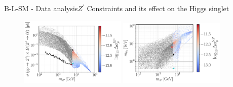 \documentclass[10pt,xcolor=dvipsnames,mathserif]{beamer}
\begin{document}
\begin{frame}{B-L-SM - Data analysis}{$Z^\prime$ Constraints and its effect on the Higgs singlet}
\begin{figure}[!htb]
	\centering
	\includegraphics[width=0.45\textwidth]{Images/BLSM_2/mZp_Xsec_Amu.pdf}
	\includegraphics[width=0.45\textwidth]{Images/BLSM_2/mZp_Mhp_Amu.pdf}
	\label{fig:Plots1}
\end{figure}	
%


\end{frame}
\end{document}
